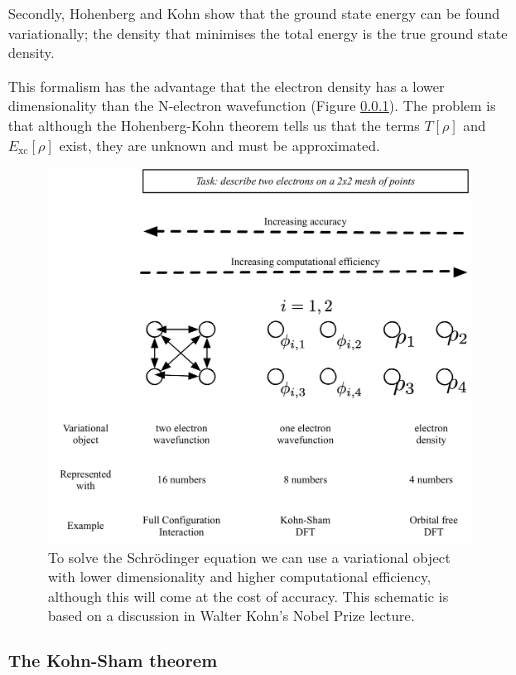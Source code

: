 Secondly, Hohenberg and Kohn show that the ground state energy can be found variationally; the density that minimises the total energy is the true ground state density.

This formalism has the advantage that the electron density has a lower dimensionality than the N-electron wavefunction (Figure \ref{}). The problem is that although the Hohenberg-Kohn theorem tells us that the terms $T\left[\rho\right]$ and $E_{\textrm{xc}}\left[\rho\right]$ exist, they are unknown and must be approximated.

\begin{figure}[h]
\centering
  \includegraphics[resolution=450]{figures/ch3/dimensions.png}
  \caption[Dimensionality of variational objects]{To solve the Schr\"{o}dinger equation we can use a variational object with lower dimensionality and higher computational efficiency, although this will come at the cost of accuracy. This schematic is based on a discussion in Walter Kohn's Nobel Prize lecture.\autocite{Kohn1999}}
  \label{decouple}
\end{figure}


\subsubsection{The Kohn-Sham theorem} 

